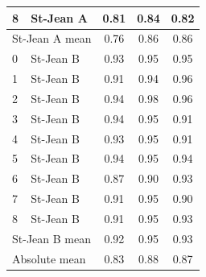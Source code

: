 \begin{table}
{\begin{tabular}{l l c c c}
    8 & St-Jean A & 0.81 & 0.84 & 0.82 \\
    \midrule
    \multicolumn{2}{l}{St-Jean A mean} & 0.76 & 0.86 & 0.86 \\
    \midrule
    0 & St-Jean B & 0.93 & 0.95 & 0.95 \\
    1 & St-Jean B & 0.91 & 0.94 & 0.96 \\
    2 & St-Jean B & 0.94 & 0.98 & 0.96 \\
    3 & St-Jean B & 0.94 & 0.95 & 0.91 \\
    4 & St-Jean B & 0.93 & 0.95 & 0.91 \\
    5 & St-Jean B & 0.94 & 0.95 & 0.94 \\
    6 & St-Jean B & 0.87 & 0.90 & 0.93 \\
    7 & St-Jean B & 0.91 & 0.95 & 0.90 \\
    8 & St-Jean B & 0.91 & 0.95 & 0.93 \\
    \midrule
    \multicolumn{2}{l}{St-Jean B mean} & 0.92 & 0.95 & 0.93 \\
    \midrule
    \multicolumn{2}{l}{Absolute mean} & 0.83 & 0.88 & 0.87 \\
    \bottomrule
  \end{tabular}
  }
\end{table}

